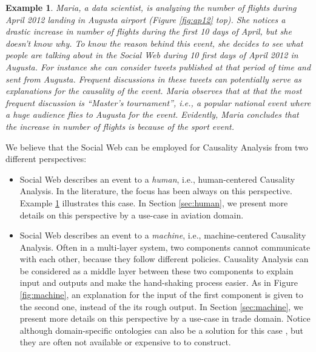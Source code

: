 \documentclass[conference]{IEEEtran}
\newtheorem{example}{Example}
\begin{document}
\begin{example}
\label{ex:flight}
Maria, a data scientist, is analyzing the number of flights during April 2012 landing in Augusta airport (Figure \ref{fig:ap12} top). She notices a drastic increase in number of flights during the first 10 days of April, but she doesn't know why. To know the reason behind this event, she decides to see what people are talking about in the Social Web during 10 first days of April 2012 in Augusta. For instance she can consider tweets published at that period of time and sent from Augusta. Frequent discussions in these tweets can potentially serve as explanations for the causality of the event. Maria observes that at that the most frequent discussion is ``Master's tournament'', i.e., a popular national event where a huge audience flies to Augusta for the event. Evidently, Maria concludes that the increase in number of flights is because of the sport event.
\end{example}

We believe that the Social Web can be employed for Causality Analysis from two different perspectives:

\begin{itemize}
\item Social Web describes an event to a {\em human}, i.e., human-centered Causality Analysis. In the literature, the focus has been always on this perspective. Example \ref{ex:flight} illustrates this case. In Section \ref{sec:human}, we present more details on this perspective by a use-case in aviation domain.
\vspace{5pt}
\item Social Web describes an event to a {\em machine}, i.e., machine-centered Causality Analysis. Often in a multi-layer system, two components cannot communicate with each other, because they follow different policies. Causality Analysis can be considered as a middle layer between these two components to explain input and outputs and make the hand-shaking process easier. As in Figure \ref{fig:machine}, an explanation for the input of the first component is given to the second one, instead of the its rough output. In Section \ref{sec:machine}, we present more details on this perspective by a use-case in trade domain. Notice although domain-specific ontologies can also be a solution for this case \cite{meij2011mapping}, but they are often not available or expensive to to construct.
\end{itemize}
\end{document}
